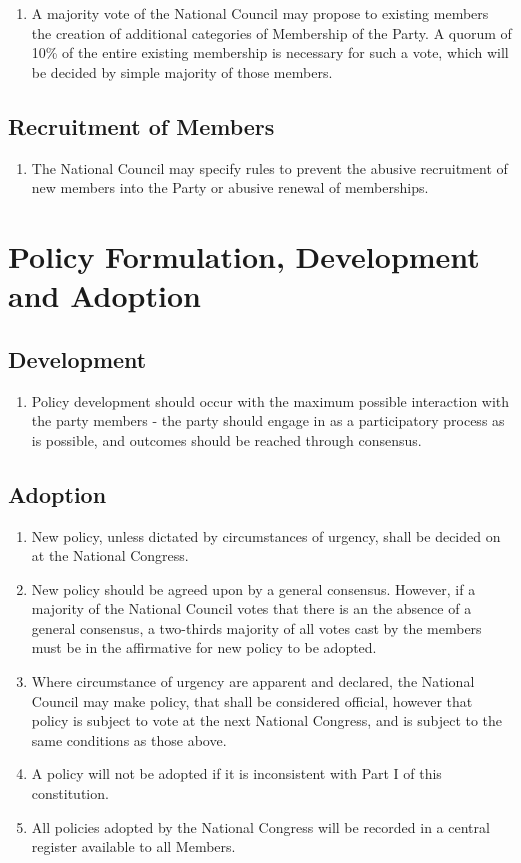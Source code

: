 \documentclass[a4paper,titlepage,8.5pt]{article}
\begin{document}
\begin{enumerate}
\item A majority vote of the National Council may propose to existing members the creation of additional categories of Membership of the Party. A quorum of 10\% of the entire existing membership is necessary for such a vote, which will be decided by simple majority of those members. 
\end{enumerate}

\subsection{Recruitment of Members}

\begin{enumerate}
\item The National Council may specify rules to prevent the abusive recruitment of new members into the Party or abusive renewal of memberships. 
\end{enumerate}

\section{Policy Formulation, Development and Adoption}

\subsection{Development}

\begin{enumerate}
\item Policy development should occur with the maximum possible interaction with the party members - the party should engage in as a participatory process as is possible, and outcomes should be reached through consensus.
\end{enumerate}

\subsection{Adoption}

\begin{enumerate}
\item New policy, unless dictated by circumstances of urgency, shall be decided on at the National Congress.
\item New policy should be agreed upon by a general consensus. However, if a majority of the National Council votes that there is an the absence of a general consensus, a two-thirds majority of all votes cast by the members must be in the affirmative for new policy to be adopted. 
\item Where circumstance of urgency are apparent and declared, the National Council may make policy, that shall be considered official, however that policy is subject to vote at the next National Congress, and is subject to the same conditions as those above. 
\item A policy will not be adopted if it is inconsistent with Part I of this constitution.
\item All policies adopted by the National Congress will be recorded in a central register available to all Members.
\end{enumerate}
\end{document}
